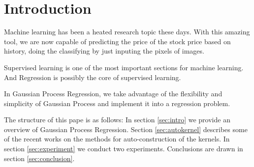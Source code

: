 \section{Introduction} \label{sec:introduction}

Machine learning has been a heated research topic these days. With this amazing tool, we are now capable of predicting the price of the stock price based on history, doing the classifying by just inputing the pixels of images.

Supervised learning is one of the most important sections for machine learning. And Regression is possibly the core of supervised learning.

In Gaussian Process Regression, we take advantage of the flexibility and simplicity of Gaussian Process and implement it into a regression problem. 


The structure of this pape is as follows: 
In section \ref{sec:intro} we provide an overview of Gaussian Process Regression. 
Section \ref{sec:autokernel} describes some of the recent works on the methods for auto-construction of the kernels.
In section \ref{sec:experiment} we conduct two experiments.
Conclusions are drawn in section \ref{sec:conclusion}.

